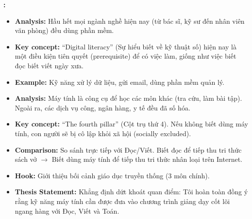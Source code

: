 \textbf{:}


\begin{itemize}
\tightlist
\item
  \textbf{Analysis:} Hầu hết mọi ngành nghề hiện nay (từ bác sĩ, kỹ sư
  đến nhân viên văn phòng) đều dùng phần mềm.
\item
  \textbf{Key concept:} ``Digital literacy'' (Sự hiểu biết về kỹ thuật
  số) hiện nay là một điều kiện tiên quyết (prerequisite) để có việc
  làm, giống như việc biết đọc biết viết ngày xưa.
\item
  \textbf{Example:} Kỹ năng xử lý dữ liệu, gửi email, dùng phần mềm quản
  lý.
\end{itemize}


\begin{itemize}
\tightlist
\item
  \textbf{Analysis:} Máy tính là công cụ để học các môn khác (tra cứu,
  làm bài tập). Ngoài ra, các dịch vụ công, ngân hàng, y tế đều đã số
  hóa.
\item
  \textbf{Key concept:} ``The fourth pillar'' (Cột trụ thứ 4). Nếu không
  biết dùng máy tính, con người sẽ bị cô lập khỏi xã hội (socially
  excluded).
\item
  \textbf{Comparison:} So sánh trực tiếp với Đọc/Viết. Biết đọc để tiếp
  thu tri thức sách vở \(\rightarrow\) Biết dùng máy tính để tiếp thu
  tri thức nhân loại trên Internet.
\end{itemize}



\begin{itemize}
\tightlist
\item
  \textbf{Hook:} Giới thiệu bối cảnh giáo dục truyền thống (3 môn
  chính).
\item
  \textbf{Thesis Statement:} Khẳng định dứt khoát quan điểm: Tôi hoàn
  toàn đồng ý rằng kỹ năng máy tính cần được đưa vào chương trình giảng
  dạy cốt lõi ngang hàng với Đọc, Viết và Toán.
\end{itemize}


